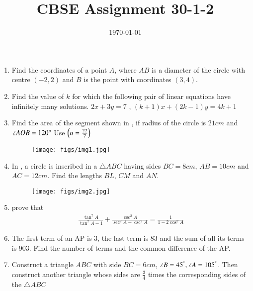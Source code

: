 \documentclass[12pt,-letter paper]{article}
\title{ CBSE Assignment 30-1-2}
\date{\today}
\begin{document}
\maketitle{}
\begin{enumerate}
     

\item Find the coordinates of a point $A$, where $AB$ is a diameter of the circle with centre $(-2, 2)$ and $B$ is the point with coordinates $(3, 4)$.
\item Find the value of $k$ for which the following pair of linear equations have infinitely many solutions. $2x+3y=7$ , $(k+1)x+(2k-1)y=4k+1$
\item Find the area of the segment shown in , if radius of the circle is $21 cm$ and $\angle AOB = 120\degree$ Use $\left(n =\frac{22}{7}\right) $
\begin{figure}[H]                                     
\centering
	
 \texttt{[image: figs/img1.jpg]}
		
\caption{}
		
\label{fig:figure1}
\end{figure}
\item In , a circle is inscribed in a $\triangle ABC$ having sides $BC=8 cm$, $AB = 10cm$ and $AC = 12 cm$. Find the lengths $BL$, $CM$ and $AN$.
                                         
\begin{figure}[H]                                     
\centering
\texttt{[image: figs/img2.jpg]}
\caption{}
\label{fig:figure2}

 \end{figure}
\item prove that \begin{align} \frac{\tan^2A}{\tan^2 A-1}+\frac{\csc^2 A}{\sec^2 A-\csc^2 A}=\frac{1}{1-2\cos^2 A}\end{align}
\item The first term of an AP is 3, the last term is 83 and the sum of all its terms is 903. Find the number of terms and the common difference of the AP.
\item Construct a triangle $ABC$ with side $BC = 6 cm$, $\angle B=45^\degree, \angle A= 105^\degree$. Then construct another triangle whose sides are $\frac{3}{4}$ times the corresponding sides of the $\triangle ABC$



\end{enumerate}
\end{document}
